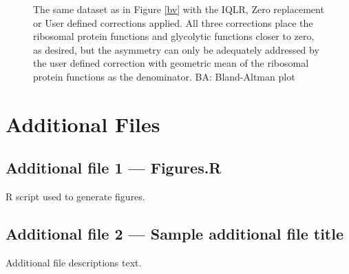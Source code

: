 \documentclass{bmcart}
\def\texttt{[image: ]}
\begin{document}
\begin{backmatter}
\begin{figure}[ht]
\caption{ The same dataset as in Figure \ref{bv} with the IQLR, Zero replacement or User defined corrections applied. All three corrections place the ribosomal protein functions and glycolytic functions closer to zero, as desired, but the asymmetry can only be adequately addressed by the user defined correction with geometric mean of the ribosomal protein functions as the denominator. BA: Bland-Altman plot }
\label{Fig:ribo}
\end{figure}



\section*{Additional Files}
  \subsection*{Additional file 1 --- Figures.R}
    R script used to generate figures. 

  \subsection*{Additional file 2 --- Sample additional file title}
    Additional file descriptions text.


\end{backmatter}
\end{document}
